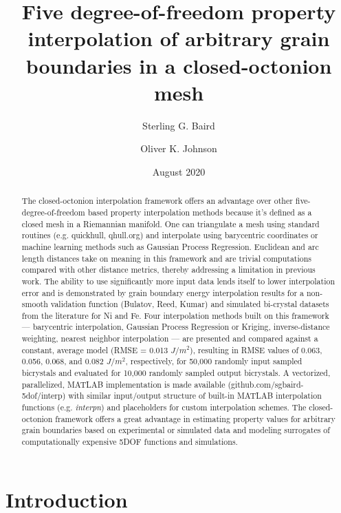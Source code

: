 \documentclass[preprint,12pt]{elsarticle}
\title{Five degree-of-freedom property interpolation of arbitrary grain boundaries in a closed-octonion mesh}
\author{Sterling G. Baird}
\author{Oliver K. Johnson}
\date{August 2020}
\begin{document}
\begin{abstract}
    The closed-octonion interpolation framework offers an advantage over other five-degree-of-freedom based property interpolation methods because it's defined as a closed mesh in a Riemannian manifold. One can triangulate a mesh using standard routines (e.g. quickhull, qhull.org) and interpolate using barycentric coordinates or machine learning methods such as Gaussian Process Regression. Euclidean and arc length distances take on meaning in this framework and are trivial computations compared with other distance metrics, thereby addressing a limitation in previous work. The ability to use significantly more input data lends itself to lower interpolation error and is demonstrated by grain boundary energy interpolation results for a non-smooth validation function (Bulatov, Reed, Kumar) and simulated bi-crystal datasets from the literature for Ni and Fe. Four interpolation methods built on this framework --- barycentric interpolation, Gaussian Process Regression or Kriging, inverse-distance weighting, nearest neighbor interpolation --- are presented and compared against a constant, average model (RMSE = 0.013 $J/m^2$), resulting in RMSE values of 0.063, 0.056, 0.068, and 0.082 $J/m^2$, respectively, for 50,000 randomly input sampled bicrystals and evaluated for 10,000 randomly sampled output bicrystals. A vectorized, parallelized, MATLAB implementation is made available (github.com/sgbaird-5dof/interp) with similar input/output structure of built-in MATLAB interpolation functions (e.g. \textit{interpn}) and placeholders for custom interpolation schemes. The closed-octonion framework offers a great advantage in estimating property values for arbitrary grain boundaries based on experimental or simulated data and modeling surrogates of computationally expensive 5DOF functions and simulations.
\end{abstract}

\maketitle

\section{Introduction} \label{sec:intro}
\end{document}
